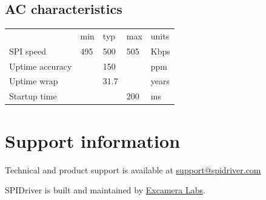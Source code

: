 \documentclass{article}
\newcommand{\heavyline}{\specialrule{1pt}{1pt}{1pt}}
\begin{document}
\subsection{AC characteristics}
\vspace{10 pt}

{\renewcommand{\arraystretch}{1.2}%
\begin{tabularx}{\linewidth}{XC{40pt}C{40pt}C{40pt}C{40pt}}
\heavyline
& min & typ & max & units \\ \heavyline

SPI speed                     &495& 500 &505& Kbps   \\ \hline
Uptime accuracy               && 150 && ppm           \\ \hline
Uptime wrap                   && 31.7 && years        \\ \hline
Startup time & & & 200 & ms \\ \hline
\end{tabularx}}
\vspace{10 pt}

\section{Support information}

Technical and product support is available at
\href{mailto:support@spidriver.com}{support@spidriver.com}

SPIDriver is built and maintained by
\href{https://excamera.com}{Excamera Labs}.
\end{document}
